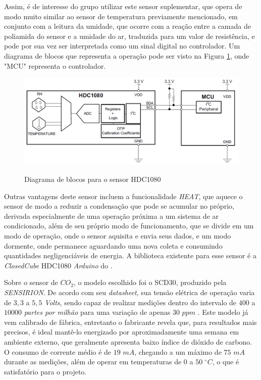 \documentclass[acronym,symbols,table]{fei}
\begin{document}
Assim, é de interesse do grupo utilizar este sensor suplementar, que opera de modo muito similar ao sensor de temperatura previamente mencionado, em conjunto com a leitura da umidade, que ocorre com a reação entre a camada de poliamida do sensor e a umidade do ar, traduzida para um valor de resistência, e pode por sua vez ser interpretada como um sinal digital no controlador. Um diagrama de blocos que representa a operação pode ser visto na Figura \ref{fig:DiagBlocHum}, onde "MCU" representa o controlador.

\begin{figure}[!htb]
\centering
    \caption{Diagrama de blocos para o sensor HDC1080}
    \includegraphics[width=0.75\linewidth]{Imagens/DiagBlocHum.png}
    \label{fig:DiagBlocHum}
\end{figure}

Outras vantagens deste sensor incluem a funcionalidade \textit{HEAT}, que aquece o sensor de modo a reduzir a condensação que pode se acumular no próprio, derivada especialmente de uma operação próxima a um sistema de ar condicionado, além de seu próprio modo de funcionamento, que se divide em um modo de operação, onde o sensor aquisita e envia seus dados, e um modo dormente, onde permanece aguardando uma nova coleta e consumindo quantidades negligenciáveis de energia. A biblioteca existente para esse sensor é a \textit{ClosedCube} HDC1080 \textit{Arduino} do \textcite{ClosedCubeHDC1080}.

Sobre o sensor de ${CO}_{2}$, o modelo escolhido foi o SCD30, produzido pela \textit{SENSIRION}. De acordo com seu \textit{datasheet}, sua tensão elétrica de operação varia de $3,3$ a $5,5$ \textit{Volts}, sendo capaz de realizar medições dentro do intervalo de $400$ a $10000$ \textit{partes por milhão} para uma variação de apenas $30$ $ppm$ \cite{SCD30}. Este modelo já vem calibrado de fábrica, entretanto o fabricante revela que, para resultados mais precisos, é ideal mantê-lo energizado por aproximadamente uma semana em ambiente externo, que geralmente apresenta baixo índice de dióxido de carbono. O consumo de corrente médio é de $19$ $mA$, chegando a um máximo de $75$ $mA$ durante as medições, além de operar em temperaturas de $0$ a $50$ $^{\circ}C$, o que é satisfatório para o projeto. 
\end{document}
